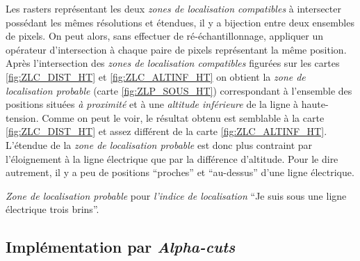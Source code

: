 Les rasters représentant les deux \emph{zones de localisation
  compatibles} à intersecter possédant les mêmes résolutions et
étendues, il y a bijection entre deux ensembles de pixels. On peut
alors, sans effectuer de ré-échantillonnage, appliquer un opérateur
d'intersection à chaque paire de pixels représentant la même
position. Après l'intersection des \emph{zones de localisation
  compatibles} figurées sur les cartes \ref{fig:ZLC_DIST_HT} et
\ref{fig:ZLC_ALTINF_HT} on obtient la \emph{zone de localisation
  probable} (carte \ref{fig:ZLP_SOUS_HT}) correspondant à l'ensemble
des positions situées \emph{à proximité} et à une \emph{altitude
  inférieure} de la ligne à haute-tension. Comme on peut le voir, le
résultat obtenu est semblable à la carte \ref{fig:ZLC_DIST_HT} et
assez différent de la carte \ref{fig:ZLC_ALTINF_HT}. L'étendue de la
\emph{zone de localisation probable} est donc plus contraint par
l'éloignement à la ligne électrique que par la différence
d'altitude. Pour le dire autrement, il y a peu de positions
\enquote{proches} et \enquote{au-dessus} d'une ligne électrique.

\begin{carte}
  \centering
  
  \caption{\emph{Zone de localisation probable} pour \emph{l'indice de
      localisation} \enquote{Je suis sous une ligne électrique trois
      brins}.}
  \label{fig:ZLP_SOUS_HT}
\end{carte}


\subsection{Implémentation par \emph{Alpha-cuts}}

